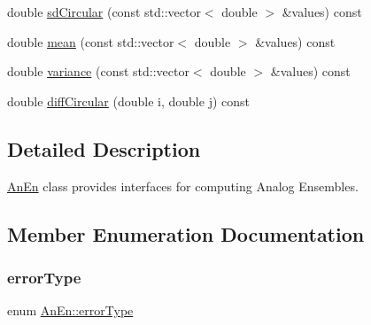 \begin{DoxyCompactItemize}
double \mbox{\hyperlink{class_an_en_aa06ebc1ce7ac87369156dc88976042a1}{sd\+Circular}} (const std\+::vector$<$ double $>$ \&values) const
\item 
double \mbox{\hyperlink{class_an_en_adc4ff05a5f03529fbd95f0547606f83e}{mean}} (const std\+::vector$<$ double $>$ \&values) const
\item 
double \mbox{\hyperlink{class_an_en_abf793d4b89afaf4d647df74c172a6018}{variance}} (const std\+::vector$<$ double $>$ \&values) const
\item 
double \mbox{\hyperlink{class_an_en_a0d0293f2d6a92c95919a937422dc86a9}{diff\+Circular}} (double i, double j) const
\end{DoxyCompactItemize}


\subsection{Detailed Description}
\mbox{\hyperlink{class_an_en}{An\+En}} class provides interfaces for computing Analog Ensembles. 

\subsection{Member Enumeration Documentation}
\mbox{\label{class_an_en_a0e256eb89d102d318a47d936b02242bf}} 
\subsubsection{\texorpdfstring{error\+Type}{errorType}}
{\footnotesize\ttfamily enum \mbox{\hyperlink{class_an_en_a0e256eb89d102d318a47d936b02242bf}{An\+En\+::error\+Type}}}

